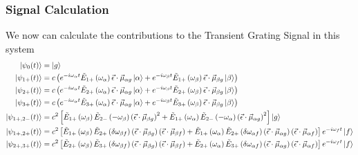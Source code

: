 \subsubsection{Signal Calculation}
We now can calculate the contributions to the Transient Grating Signal in this system
\begin{align*}
	\ket{\psi_{0} (t)} &=  \ket{g} \\
	\ket{\psi_{1+}(t)} &= c \left( e^{-i \omega_{\alpha} t }\tilde{E}_{1+} \left( \omega_{\alpha} \right) \vec{\epsilon} \cdot \vec{\mu}_{\alpha g}  \ket{\alpha} + e^{-i \omega_{\beta} t }\tilde{E}_{1+} \left( \omega_{\beta} \right) \vec{\epsilon} \cdot \vec{\mu}_{\beta g}  \ket{\beta}  \right)  \\
	\ket{\psi_{2+}(t)} &= c \left( e^{-i \omega_{\alpha} t }\tilde{E}_{2+} \left( \omega_{\alpha} \right) \vec{\epsilon} \cdot \vec{\mu}_{\alpha g}  \ket{\alpha} + e^{-i \omega_{\beta} t }\tilde{E}_{2+} \left( \omega_{\beta} \right) \vec{\epsilon} \cdot \vec{\mu}_{\beta g}  \ket{\beta}  \right) \\
	\ket{\psi_{3+}(t)} &= c \left( e^{-i \omega_{\alpha} t }\tilde{E}_{3+} \left( \omega_{\alpha} \right) \vec{\epsilon} \cdot \vec{\mu}_{\alpha g}  \ket{\alpha} + e^{-i \omega_{\beta} t }\tilde{E}_{3+} \left( \omega_{\beta} \right) \vec{\epsilon} \cdot \vec{\mu}_{\beta g}  \ket{\beta}  \right) \\
	\ket{\psi_{1+,2-}(t)} &= c^2 \left[ \tilde{E}_{1+} \left( \omega_{\beta} \right) \tilde{E}_{2-} \left( -\omega_{\beta} \right) \left( \vec{\epsilon} \cdot \vec{\mu}_{\beta g} \right)^2 + \tilde{E}_{1+} \left( \omega_{\alpha} \right) \tilde{E}_{2-} \left( -\omega_{\alpha} \right) \left( \vec{\epsilon} \cdot \vec{\mu}_{\alpha g} \right)^2 \right] \ket{g}\\
	\ket{\psi_{1+,2+}(t)} &= c^2 \left[ \tilde{E}_{1+} \left( \omega_{\beta} \right) \tilde{E}_{2+} \left( \delta \omega_{\beta f} \right) \left( \vec{\epsilon} \cdot \vec{\mu}_{\beta g} \right) \left( \vec{\epsilon} \cdot \vec{\mu}_{\beta f} \right) + \tilde{E}_{1+} \left( \omega_{\alpha} \right) \tilde{E}_{2+} \left( \delta\omega_{\alpha f} \right) \left( \vec{\epsilon} \cdot \vec{\mu}_{\alpha g} \right) \left( \vec{\epsilon} \cdot \vec{\mu}_{\alpha f} \right) \right]e^{- i \omega_f t} \ket{f}\\
	\ket{\psi_{2+,3+}(t)} &= c^2 \left[ \tilde{E}_{2+} \left( \omega_{\beta} \right) \tilde{E}_{3+} \left( \delta \omega_{\beta f} \right) \left( \vec{\epsilon} \cdot \vec{\mu}_{\beta g} \right) \left( \vec{\epsilon} \cdot \vec{\mu}_{\beta f} \right) + \tilde{E}_{2+} \left( \omega_{\alpha} \right) \tilde{E}_{3+} \left( \delta\omega_{\alpha f} \right) \left( \vec{\epsilon} \cdot \vec{\mu}_{\alpha g} \right) \left( \vec{\epsilon} \cdot \vec{\mu}_{\alpha f} \right) \right]e^{- i \omega_f t} \ket{f}\\

\end{align*}

